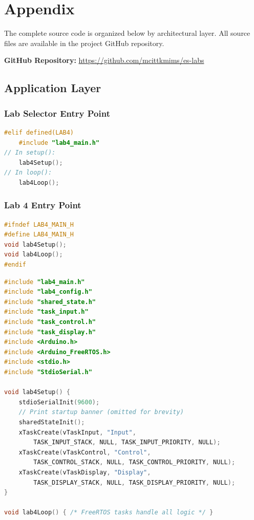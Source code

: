 \section{Appendix}

The complete source code is organized below by architectural layer. All source files are available in the project GitHub repository.

\textbf{GitHub Repository:} \url{https://github.com/mcittkmims/es-labs}

\subsection{Application Layer}

\subsubsection{Lab Selector Entry Point}

\begin{lstlisting}[language=C++, caption=src/main.cpp --- Lab selector (Lab 4 section), label=lst:app_main]
#elif defined(LAB4)
    #include "lab4_main.h"
// In setup():
    lab4Setup();
// In loop():
    lab4Loop();
\end{lstlisting}

\subsubsection{Lab 4 Entry Point}

\begin{lstlisting}[language=C++, caption=lab4\_main.h --- Lab 4 entry point interface, label=lst:lab4_main_h]
#ifndef LAB4_MAIN_H
#define LAB4_MAIN_H
void lab4Setup();
void lab4Loop();
#endif
\end{lstlisting}

\begin{lstlisting}[language=C++, caption=lab4\_main.cpp --- Lab 4 entry point implementation, label=lst:lab4_main_cpp]
#include "lab4_main.h"
#include "lab4_config.h"
#include "shared_state.h"
#include "task_input.h"
#include "task_control.h"
#include "task_display.h"
#include <Arduino.h>
#include <Arduino_FreeRTOS.h>
#include <stdio.h>
#include "StdioSerial.h"

void lab4Setup() {
    stdioSerialInit(9600);
    // Print startup banner (omitted for brevity)
    sharedStateInit();
    xTaskCreate(vTaskInput, "Input",
        TASK_INPUT_STACK, NULL, TASK_INPUT_PRIORITY, NULL);
    xTaskCreate(vTaskControl, "Control",
        TASK_CONTROL_STACK, NULL, TASK_CONTROL_PRIORITY, NULL);
    xTaskCreate(vTaskDisplay, "Display",
        TASK_DISPLAY_STACK, NULL, TASK_DISPLAY_PRIORITY, NULL);
}

void lab4Loop() { /* FreeRTOS tasks handle all logic */ }
\end{lstlisting}

